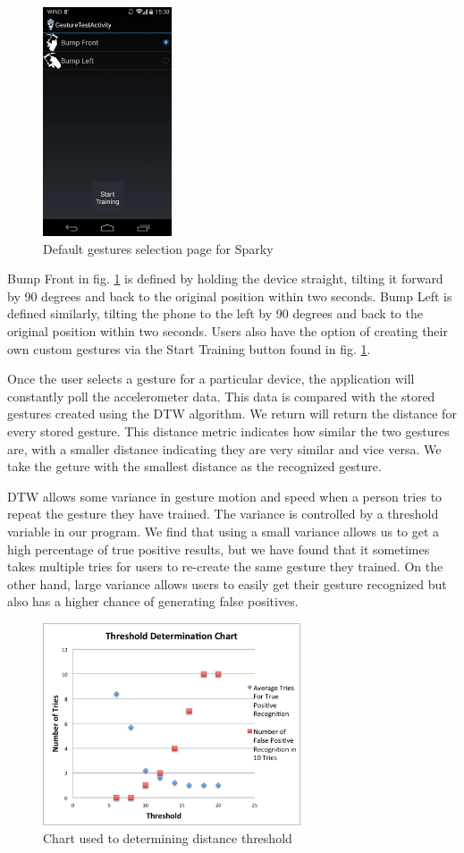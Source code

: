 \documentclass[journal]{IEEEtran}
\begin{document}
\begin{figure}[H]
\centering
\includegraphics[width=1.5in]{S1.jpg}
\caption{Default gestures selection page for Sparky}
\label{fig2}
\end{figure}


Bump Front in fig. \ref{fig2} is defined by holding the device straight, tilting it forward by 90 degrees and back to the original position within two seconds. Bump Left is defined similarly, tilting the phone to the left by 90 degrees and back to the original position within two seconds. Users also have the option of creating their own custom gestures via the Start Training button found in fig. \ref{fig2}.

Once the user selects a gesture for a particular device,  the application will constantly poll the accelerometer data. This data is compared with the stored gestures created using the DTW algorithm. We return will return the distance for every stored gesture. This distance metric indicates how similar the two gestures are, with a smaller distance indicating they are very similar and vice versa. We take the geture with the smallest distance as the recognized gesture. 

DTW allows some variance in gesture motion and speed when a person tries to repeat the gesture they have trained. The variance is controlled by a threshold variable in our program. We find that using a small variance allows us to get a high percentage of true positive results, but we have found that it sometimes takes multiple tries for users to re-create the same gesture they trained. On the other hand, large variance allows users to easily get their gesture recognized but also has a higher chance of generating false positives.

\begin{figure}[H]
\centering
\includegraphics[width=3in]{threshold.png}
\caption{Chart used to determining distance threshold}
\label{fig3}
\end{figure}
\end{document}
